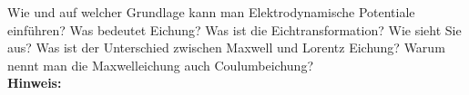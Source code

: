 \begin{question}[section=5,subsection=51,name={Elektrodynamische Potentiale},difficulty=8,type=mdl,tags={}]
	Wie und auf welcher Grundlage kann man Elektrodynamische Potentiale einführen? Was bedeutet Eichung? Was ist die Eichtransformation? Wie sieht Sie aus? Was ist der Unterschied zwischen Maxwell und Lorentz Eichung? Warum nennt man die Maxwelleichung auch Coulumbeichung?
	\\ \textbf{Hinweis:}\\
	
\end{question}
\begin{solution}
	
\end{solution}